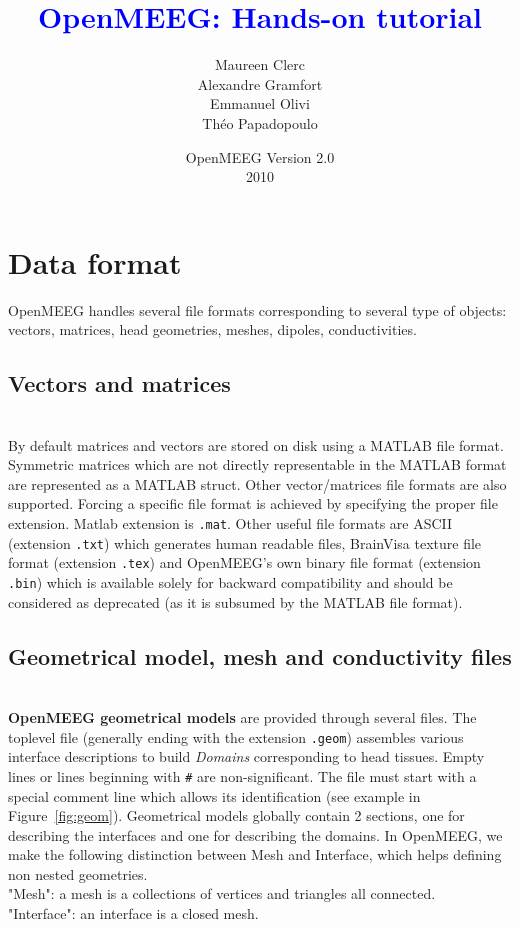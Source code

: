 \documentclass[10pt,journal]{book}
\title{\textbf{\textcolor{blue}{OpenMEEG: Hands-on tutorial}}}
\author{Maureen Clerc\\Alexandre Gramfort \\
        Emmanuel Olivi \\Théo Papadopoulo}
\date{OpenMEEG Version 2.0 \\2010}
\begin{document}
    \maketitle
    \tableofcontents



\chapter{Data format}

OpenMEEG handles several file formats corresponding to several type of objects: vectors, matrices, head geometries, meshes, dipoles, conductivities.

    \section{Vectors and matrices}\mbox{ }\\
    By default matrices and vectors are stored on disk using a MATLAB file format. Symmetric matrices which are not directly representable in the MATLAB
    format are represented as a MATLAB struct. Other vector/matrices file formats are also supported. Forcing a specific file format is achieved by
    specifying the proper file extension. Matlab extension is {\tt .mat}. Other useful file formats are ASCII (extension {\tt .txt}) which generates
    human readable files, BrainVisa texture file format (extension {\tt .tex}) and OpenMEEG's own binary file format (extension {\tt .bin}) which is available
    solely for backward compatibility and should be considered as deprecated (as it is subsumed by the MATLAB file format).

    \section{Geometrical model,  mesh and conductivity files}\mbox{ }\\
    {\bf OpenMEEG geometrical models} are provided through several files. The toplevel file (generally ending with the extension {\tt .geom}) assembles various
    interface descriptions to build \emph{Domains} corresponding to head tissues. Empty lines or lines beginning with {\tt \#} are non-significant.
    The file must start with a special comment line which allows its identification (see example in Figure~\ref{fig:geom}). 
    Geometrical models globally contain 2 sections, one for describing the interfaces and one for describing the domains.
    In OpenMEEG, we make the following distinction between Mesh and Interface, which helps defining non nested geometries. \\
    "Mesh": a mesh is a collections of vertices and triangles all connected.\\
    "Interface": an interface is a closed mesh.\\
\end{document}
